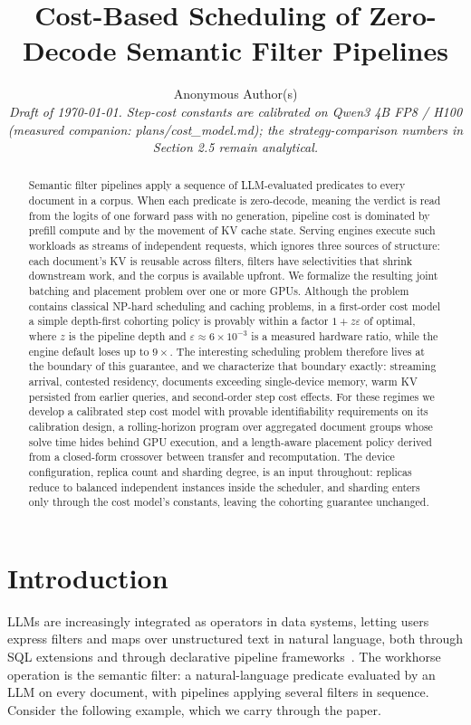 \documentclass[10pt,twocolumn]{article}
\title{\textbf{Cost-Based Scheduling of Zero-Decode Semantic Filter Pipelines}}
\author{
  Anonymous Author(s)\\
  \textit{Draft of \today. Step-cost constants are calibrated on Qwen3 4B FP8 / H100 (measured companion: plans/cost\_model.md); the strategy-comparison numbers in Section 2.5 remain analytical.}
}
\date{}
\newcommand{\eps}{\varepsilon}
\begin{document}
\maketitle

\begin{abstract}
Semantic filter pipelines apply a sequence of LLM-evaluated predicates to every document in a corpus. When each predicate is zero-decode, meaning the verdict is read from the logits of one forward pass with no generation, pipeline cost is dominated by prefill compute and by the movement of KV cache state. Serving engines execute such workloads as streams of independent requests, which ignores three sources of structure: each document's KV is reusable across filters, filters have selectivities that shrink downstream work, and the corpus is available upfront. We formalize the resulting joint batching and placement problem over one or more GPUs. Although the problem contains classical NP-hard scheduling and caching problems, in a first-order cost model a simple depth-first cohorting policy is provably within a factor $1 + z\eps$ of optimal, where $z$ is the pipeline depth and $\eps \approx 6 \times 10^{-3}$ is a measured hardware ratio, while the engine default loses up to $9\times$. The interesting scheduling problem therefore lives at the boundary of this guarantee, and we characterize that boundary exactly: streaming arrival, contested residency, documents exceeding single-device memory, warm KV persisted from earlier queries, and second-order step cost effects. For these regimes we develop a calibrated step cost model with provable identifiability requirements on its calibration design, a rolling-horizon program over aggregated document groups whose solve time hides behind GPU execution, and a length-aware placement policy derived from a closed-form crossover between transfer and recomputation. The device configuration, replica count and sharding degree, is an input throughout: replicas reduce to balanced independent instances inside the scheduler, and sharding enters only through the cost model's constants, leaving the cohorting guarantee unchanged.
\end{abstract}

\section{Introduction}
\label{sec:intro}

LLMs are increasingly integrated as operators in data systems, letting users express filters and maps over unstructured text in natural language, both through SQL extensions and through declarative pipeline frameworks~\cite{docetl,lotus,palimpzest}. The workhorse operation is the semantic filter: a natural-language predicate evaluated by an LLM on every document, with pipelines applying several filters in sequence. Consider the following example, which we carry through the paper.
\end{document}
